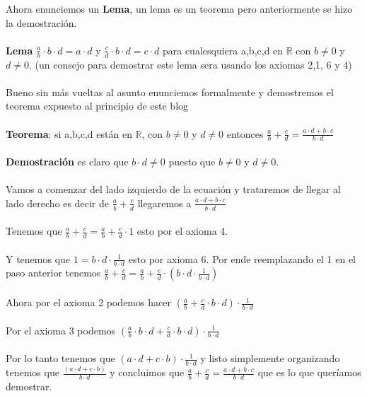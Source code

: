 \documentclass{article}
\begin{document}
     Ahora enunciemos un \textbf{Lema}, un lema es un teorema pero anteriormente se hizo la demostración.
\\ \\ 
\textbf{Lema} $\frac{a}{b}\cdot b \cdot d = a \cdot d $  y $\frac{c}{d} \cdot b \cdot d = c \cdot d$ para cualesquiera a,b,c,d en $\mathbb R$
con $b \not = 0$ y $d \not = 0$. (un consejo para demostrar este lema sera usando los axiomas 2,1, 6 y 4) 
\\ \\ 
     Bueno sin más vueltas al asunto enunciemos formalmente y demostremos el teorema expuesto al principio de este blog \\ \\
\textbf{Teorema}: si a,b,c,d están en $\mathbb R$, con $b \not = 0$ y $d \not = 0$ entonces $\frac{a}{b}+\frac{c}{d}=\frac{a \cdot d + b \cdot c}{b \cdot d}$
\\ \\
\textbf{Demostración} es claro que $b \cdot d \not = 0$ puesto que $b \not = 0$ y $d \not = 0$.
\\ \\ 
Vamos a comenzar del lado izquierdo de la ecuación y trataremos de llegar al lado derecho es decir de $\frac{a}{b}+\frac{c}{d}$
llegaremos a $\frac{a \cdot d + b \cdot c}{b \cdot d}$
\\ \\
Tenemos que $\frac{a}{b}+\frac{c}{d}= \frac{a}{b}+\frac{c}{d} \cdot 1$ esto por el axioma 4.
\\ \\
     Y tenemos que $1 = b \cdot d \cdot \frac{1}{b \cdot d}$ esto por axioma 6. Por ende reemplazando el 1 en el paso anterior tenemos
$\frac{a}{b}+\frac{c}{d}= \frac{a}{b}+\frac{c}{d} \cdot (b \cdot d \cdot \frac{1}{b \cdot d}) $ 
\\ \\ 
Ahora por el axioma 2 podemos hacer $(\frac{a}{b}+\frac{c}{d} \cdot b \cdot d )\cdot \frac{1}{b \cdot d}$
\\ \\ 
Por el axioma 3 podemos $(\frac{a}{b}\cdot b \cdot d + \frac{c}{d} \cdot b \cdot d) \cdot \frac{1}{b \cdot d}$
\\ \\ Por lo tanto tenemos que $(a \cdot d + c \cdot b) \cdot \frac{1}{b \cdot d}$ y listo simplemente organizando tenemos que $\frac{(a \cdot d + c \cdot b)}{b \cdot d} $
     y concluimos que $\frac{a}{b}+\frac{c}{d}=\frac{a \cdot d + b \cdot c}{b \cdot d}$ que es lo que queríamos demostrar.
\end{document}
